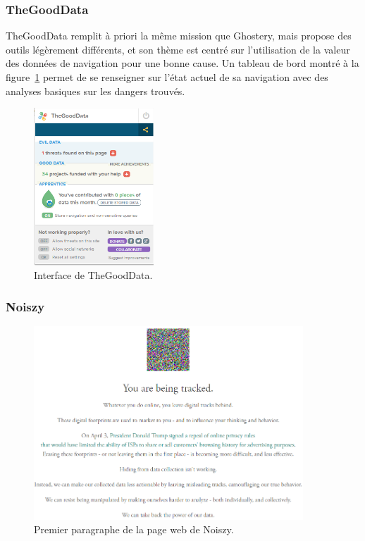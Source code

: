 		\subsubsection{TheGoodData}

			TheGoodData remplit à priori la même mission que Ghostery, mais propose des outils légèrement différents, et son thème est centré sur l'utilisation de la valeur des données de navigation pour une bonne cause. Un tableau de bord montré à la figure~\ref{a-thegooddata} permet de se renseigner sur l'état actuel de sa navigation avec des analyses basiques sur les dangers trouvés.

			\begin{figure}[h]
				\centering
				\includegraphics[width=0.4\textwidth]{images/analysis/thegooddata}
				\caption{Interface de TheGoodData\cite{thegooddata}.}
				\label{a-thegooddata}
			\end{figure}

		\subsubsection{Noiszy}

			\begin{figure}[h]
				\centering
				\includegraphics[width=0.9\textwidth]{images/analysis/noiszy}
				\caption{Premier paragraphe de la page web de Noiszy\cite{noiszy}.}
				\label{a-noiszy}
			\end{figure}

